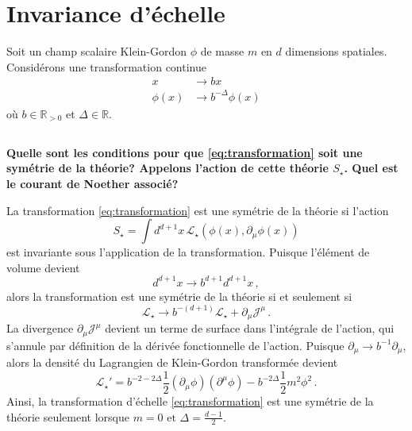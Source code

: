 \documentclass{article}
\numberwithin{equation}{section}
\theoremstyle{solution}
\begin{document}
\section{Invariance d'échelle}
Soit un champ scalaire Klein-Gordon $\phi$ de masse $m$ en $d$ dimensions spatiales. Considérons une transformation continue
\begin{align}
        \label{eq:transformation}
        x &\rightarrow bx \\
        \phi(x) &\rightarrow b^{-\Delta}\phi(x)  
\end{align}
où $b \in \mathbb{R}_{>0}$ et $\Delta \in \mathbb{R}$.

\subsection{}
\textbf{Quelle sont les conditions pour que \eqref{eq:transformation} soit une symétrie de la théorie? Appelons l’action
de cette théorie $S_{\star}$. Quel est le courant de Noether associé?}
\vspace{2ex}

La transformation \eqref{eq:transformation} est une symétrie de la théorie si l'action 
\begin{equation}\label{eq:action}
        S_\star = \int d^{d+1}x\, \mathcal{L}_\star(\phi(x), \partial_{\mu}\phi(x))
\end{equation} 
est invariante sous l'application de la transformation. Puisque l'élément de volume devient
\begin{equation}
        d^{d+1}x \rightarrow b^{d+1}d^{d+1}x\, ,
\end{equation} 
alors la transformation est une symétrie de la théorie si et seulement si
\begin{equation}
       \mathcal{L}_{\star} \rightarrow b^{-(d+1)}\mathcal{L_{\star}} + \partial_{\mu}\mathcal{J}^{\mu}\, .
\end{equation} 
La divergence $\partial_{\mu}\mathcal{J}^{\mu}$ devient un terme de surface dans l'intégrale de l'action, qui 
s'annule par définition de la dérivée fonctionnelle de l'action. Puisque $\partial_{\mu} \rightarrow b^{-1}\partial_{\mu}$, alors 
la densité du Lagrangien de Klein-Gordon transformée devient
\begin{equation}\label{eq:lagrangian transform}
        \mathcal{L}_\star' = b^{-2-2\Delta}\frac{1}{2}(\partial_{\mu}\phi)(\partial^\mu \phi) - b^{-2\Delta}\frac{1}{2}m^{2}\phi^{2}\, .
\end{equation} 
Ainsi, la transformation d'échelle \eqref{eq:transformation} est une symétrie de la théorie seulement lorsque $\boxed{m=0 \text{ et } \Delta = \frac{d-1}{2}}$.
\end{document}
